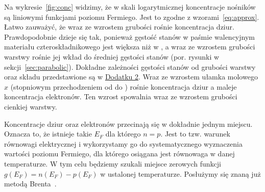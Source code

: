 \documentclass[12pt,openany,a4paper]{book}
\begin{document}
Na wykresie~\ref{fig:conc} widzimy, że w skali logarytmicznej koncentracje nośników są liniowymi
funkcjami poziomu Fermiego. Jest to zgodne z wzorami~\eqref{eq:approx}.
Łatwo zauważyć, że wraz ze wzrostem grubości rośnie koncentracja dziur. 
Prawdopodobnie dzieje się tak, ponieważ gęstość stanów w paśmie walencyjnym materiału czteroskładnikowego
jest większa niż w , a wraz ze wzrostem grubości warstwy  rośnie jej
wkład do średniej gęstości stanów (por. rysunki w sekcji~\ref{sec:parabolic}). Dokładne zależności
gęstości stanów od grubości warstwy oraz składu przedstawione są w \hyperref[chapt:dodatek2]{Dodatku 2}.
Wraz ze wzrostem ułamka molowego \(x\) (stopniowym przechodzeniem od
 do ) rośnie koncentracja dziur a maleje koncentracja
elektronów. Ten wzrost spowalnia wraz ze wzrostem grubości cienkiej warstwy.

Koncentracje dziur oraz elektronów przecinają się w dokładnie jednym miejscu. Oznacza to, że
istnieje takie \(E_F\) dla którego \(n = p\). Jest to tzw. warunek równowagi elektrycznej i wykorzystamy
go do systematycznego wyznaczenia wartości poziomu Fermiego, dla którego osiągana jest równowaga
w danej temperaturze. W tym celu będziemy szukali miejsce zerowych funkcji 
\(g(E_F) = n(E_F) - p(E_F)\) w ustalonej temperaturze. Posłużymy się znaną już metodą Brenta~\autocite{Brent1974}.
\end{document}

